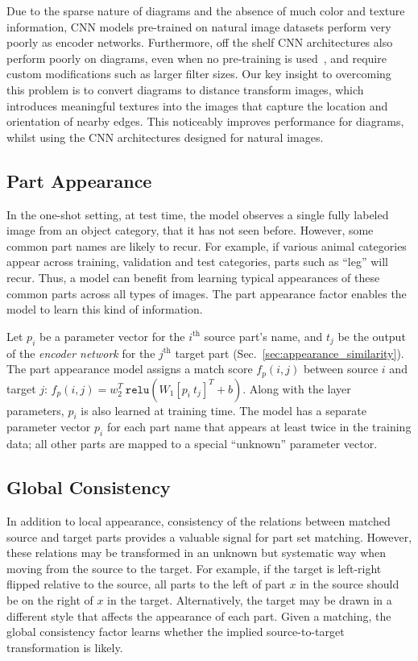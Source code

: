 \documentclass[10pt,twocolumn,letterpaper]{article}
\begin{document}
Due to the sparse nature of diagrams and the absence of much color and texture information, CNN models pre-trained on natural image datasets perform very poorly as encoder networks. Furthermore, off the shelf CNN architectures also perform poorly on diagrams, even when no pre-training is used~\cite{Yu2016SketchaNetAD}, and require custom modifications such as larger filter sizes. Our key insight to overcoming this problem is to convert diagrams to distance transform images, which introduces meaningful textures into the images that capture the location and orientation of nearby edges. This noticeably improves performance for diagrams, whilst using the CNN architectures designed for natural images.  

\subsection{Part Appearance}\label{sec:part_appearance}
In the one-shot setting, at test time, the model observes a single fully labeled image from an object category, that it has not seen before. However, some common part names are likely to recur. For example, if various animal categories appear across training, validation and test categories, parts such as ``leg'' will recur. Thus, a model can benefit from learning typical appearances of these common parts across all types of images. The part appearance factor enables the model to learn this kind of information.

Let $p_i$ be a parameter vector for the $i^\text{th}$ source part's name, and $t_j$ be the output of the \emph{encoder network} for the $j^\text{th}$ target part (Sec.~\ref{sec:appearance_similarity}). The part appearance model assigns a match score $f_p(i, j)$ between source $i$ and target $j$: $f_p(i, j) = w_2^T ~\mathtt{relu}(W_1 [p_i ~ t_j]^T + b).$%
Along with the layer parameters, $p_i$ is also learned at training time. The model has a separate parameter vector $p_i$ for each part name that appears at least twice in the training data; all other parts are mapped to a special ``unknown'' parameter vector.

\subsection{Global Consistency}\label{sec:global_consistency}
In addition to local appearance, consistency of the relations between matched source and target parts provides a valuable signal for part set matching. However, these relations may be transformed in an unknown but systematic way when moving from the source to the target. For example, if the target is left-right flipped relative to the source, all parts to the left of part $x$ in the source should be on the right of $x$ in the target. Alternatively, the target may be drawn in a different style that affects the appearance of each part. Given a matching, the global consistency factor learns whether the implied source-to-target transformation is likely.
\end{document}
